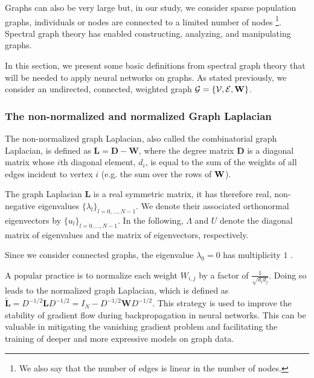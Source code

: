 Graphs can also be very large but, in our study, we consider sparse population graphs, \ie individuals or nodes are connected to a limited number of nodes \footnote{We also say that the number of edges is linear in the number of nodes.}.
Spectral graph theory has enabled constructing, analyzing, and manipulating graphs.


In this section, we present some basic definitions from spectral graph theory that will be needed to apply neural networks on graphs. As stated previously, we consider an undirected, connected, weighted graph $\mathcal{G} = \{\mathcal{V}, \mathcal{E}, \mathbf{W}\}$. 

\subsubsection{The non-normalized and normalized Graph Laplacian}

The non-normalized graph Laplacian, also called the combinatorial graph Laplacian, is defined 
as $\mathbf{L} = \mathbf{D}-\mathbf{W}$, where the degree matrix $\mathbf{D}$ 
is a diagonal matrix 
whose $i$th diagonal element, $d_i$, is equal to the sum of the weights of all edges incident to vertex $i$
(e.g. the sum over the rows of $\mathbf{W}$).

The graph Laplacian $\mathbf{L}$ is a real symmetric matrix, it has therefore real, non-negative eigenvalues $\{\lambda_l\}_{l=0, \dots, N-1}$. 
We denote their associated  orthonormal eigenvectors by $\{u_l\}_{l=0,\dots, N-1}$. In the following, $\Lambda$ and $U$ denote the diagonal matrix of eigenvalues and the matrix of eigenvectors, respectively.

Since we consider connected graphs, the eigenvalue $\lambda_0=0$ has multiplicity $1$  \cite{shuman_emerging_2013}. 

A popular practice is to normalize each weight $W_{i, j}$ by a factor of $\frac{1}{\sqrt{d_id_j}}$.
Doing so leads to the normalized graph Laplacian, which is defined as $\widetilde{\mathbf{L}} = D^{-1/2}\mathbf{L}D^{-1/2} = I_N - D^{-1/2}\mathbf{W}D^{-1/2}$. This strategy is used to improve the stability of gradient flow during backpropagation in neural networks. This can be valuable in mitigating the vanishing gradient problem and facilitating the training of deeper and more expressive models on graph data.


